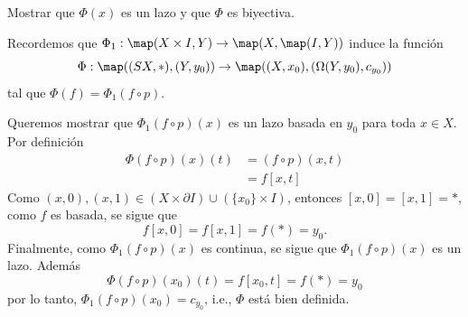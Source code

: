 \begin{ejercicio}
    Mostrar que $\Phi(x)$ es un lazo y que $\Phi$ es biyectiva.
\end{ejercicio}

\begin{demostracion}
    Recordemos que $\Phi_1:\map(X\times I,Y)\to\map(X,\map(I,Y))$ induce la función 
    \begin{equation*}
    \Phi:\map((SX,*),(Y,y_0))\to \map((X,x_0),(\Omega(Y,y_0),c_{y_0}))
\end{equation*}
tal que $\Phi(f)=\Phi_1(f\circ p)$.
    
    Queremos mostrar que $\Phi_1(f\circ p)(x)$ es un lazo basada en $y_0$ para toda $x\in X$. Por definición
    \begin{align*}
        \Phi(f\circ p)(x)(t)&=(f\circ p)(x,t)\\
        &=f[x,t]
    \end{align*}
    Como $(x,0),(x,1)\in (X\times \partial I)\cup (\{x_0\}\times I)$, entonces $[x,0]=[x,1]=*$, como $f$ es basada, se sigue que
    \begin{equation*}
        f[x,0]=f[x,1]=f(*)=y_0.
    \end{equation*}
    Finalmente, como $\Phi_1(f\circ p)(x)$ es continua, se sigue que $\Phi_1(f \circ p)(x)$ es un lazo. Además 
    \begin{equation*}
        \Phi(f\circ p)(x_0)(t)=f[x_0,t]=f(*)=y_0
    \end{equation*}
    por lo tanto, $\Phi_1(f\circ p)(x_0)=c_{y_0}$, i.e., $\Phi$ está bien definida.
    

\end{demostracion}
